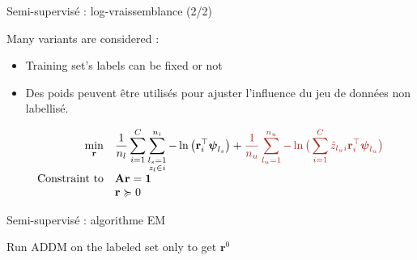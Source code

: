 \documentclass[aspectratio=1610,usenames,dvipsnames]{beamer}
\begin{document}
\begin{frame}{Semi-supervisé : log-vraissemblance (2/2)}


    Many variants are considered :
    \begin{itemize}
        \item Training set's labels can be fixed or not
        \item Des poids peuvent être utilisés pour ajuster l'influence du jeu de données non labellisé.
    \end{itemize}
    \small
    \begin{eqnarray}
      \label{eq:ll:ss}
          \begin{array}{rl}
            \displaystyle{\min_{\mathbf{r}}}
            
            &\displaystyle{
            
                \frac{1}{n_l}\sum_{i=1}^C \sum_{\substack{l_s=1\\ z_l \in i}}^{n_i}  -\ln\big(\mathbf{r}_i^\top \boldsymbol{\psi}_{l_s}\big)
            
                + \color{Mahogany}{
                    \frac{1}{n_u}  \sum_{l_u=1}^{n_u} - \ln\big(\sum_{i=1}^C \hat{z}_{l_ui} \mathbf{r}_i^\top \boldsymbol{\psi}_{l_u}\big)
                }
            
            }\\
            
               \text{Constraint to} & \mathbf{A}\mathbf{r} = \mathbf{1}\\
              & \mathbf{r} \succcurlyeq 0
          \end{array}
     \end{eqnarray}
     \normalsize

\end{frame}

\begin{frame}{Semi-supervisé : algorithme EM}

    
    \begin{algorithm}[H]
        \SetAlgoLined
        Run ADDM on the labeled set only to get \(\mathbf{r}^{0}\)\;
         \caption{Semi-supervised algorithm}
         \label{algo:em}
    \end{algorithm}
\end{frame}
\end{document}
